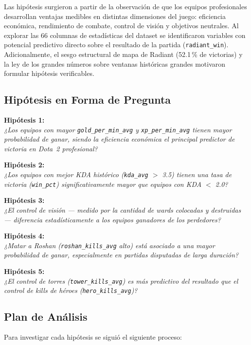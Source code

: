 \documentclass[12pt,a4paper]{article}
\begin{document}
Las hip\'otesis surgieron a partir de la observaci\'on de que los equipos
profesionales desarrollan ventajas medibles en distintas dimensiones del juego:
eficiencia econ\'omica, rendimiento de combate, control de visi\'on y objetivos
neutrales. Al explorar las 66 columnas de estad\'isticas del dataset se
identificaron variables con potencial predictivo directo sobre el resultado de la
partida (\texttt{radiant\_win}). Adicionalmente, el sesgo estructural de mapa de
Radiant (52.1\,\% de victorias) y la ley de los grandes n\'umeros sobre ventanas
hist\'oricas grandes motivaron formular hip\'otesis verificables.

\subsection{Hip\'otesis en Forma de Pregunta}

\textbf{Hip\'otesis 1:}\\
\textit{¿Los equipos con mayor \texttt{gold\_per\_min\_avg} y \texttt{xp\_per\_min\_avg}
tienen mayor probabilidad de ganar, siendo la eficiencia econ\'omica el principal
predictor de victoria en Dota~2 profesional?}

\textbf{Hip\'otesis 2:}\\
\textit{¿Los equipos con mejor KDA hist\'orico (\texttt{kda\_avg} $>$ 3.5) tienen una
tasa de victoria (\texttt{win\_pct}) significativamente mayor que equipos con
KDA $<$ 2.0?}

\textbf{Hip\'otesis 3:}\\
\textit{¿El control de visi\'on --- medido por la cantidad de wards colocadas y
destruidas --- diferencia estad\'isticamente a los equipos ganadores de los perdedores?}

\textbf{Hip\'otesis 4:}\\
\textit{¿Matar a Roshan (\texttt{roshan\_kills\_avg} alto) est\'a asociado a una
mayor probabilidad de ganar, especialmente en partidas disputadas de larga duraci\'on?}

\textbf{Hip\'otesis 5:}\\
\textit{¿El control de torres (\texttt{tower\_kills\_avg}) es m\'as predictivo del
resultado que el control de kills de h\'eroes (\texttt{hero\_kills\_avg})?}

\subsection{Plan de An\'alisis}

Para investigar cada hip\'otesis se sigui\'o el siguiente proceso:
\end{document}
